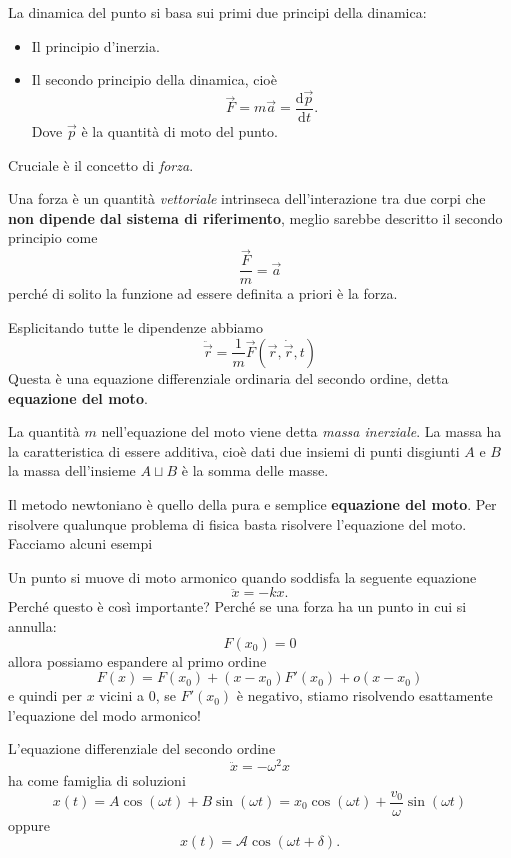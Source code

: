 \documentclass[11pt]{scrartcl}
\newcommand{\dif}{\text{d}}
\begin{document}
	La dinamica del punto si basa sui primi due principi della dinamica:
	\begin{itemize}
		\item Il principio d'inerzia.
		\item Il secondo principio della dinamica, cioè
		$$\vec{F}=m\vec{a}=\frac{\dif \vec{p}}{\dif t}.$$
		Dove $\vec{p}$ è la quantità di moto del punto.
	\end{itemize}
	Cruciale è il concetto di \textit{forza}. 
	\begin{definition}[Forza]
		Una forza è un quantità \textit{vettoriale} intrinseca dell'interazione tra due corpi che \textbf{non dipende dal sistema di riferimento}, meglio sarebbe descritto il secondo principio come
		$$\frac{\vec{F}}{m}=\vec{a}$$
		perché di solito la funzione ad essere definita a priori è la forza.
	\end{definition}
	Esplicitando tutte le dipendenze abbiamo
	$$\ddot{\vec{r}}=\frac{1}{m}\vec{F}(\vec{r},\dot{\vec{r}},t)$$
	Questa è una equazione differenziale ordinaria del secondo ordine, detta \textbf{equazione del moto}.
	\begin{definition}
		La quantità $m$ nell'equazione del moto viene detta \textit{massa inerziale}. La massa ha la caratteristica di essere additiva, cioè dati due insiemi di punti disgiunti $A$ e $B$ la massa dell'insieme $A\sqcup B$ è la somma delle masse.
	\end{definition}
	Il metodo newtoniano è quello della pura e semplice \textbf{equazione del moto}. Per risolvere qualunque problema di fisica basta risolvere l'equazione del moto. Facciamo alcuni esempi
	\begin{example}
		Un punto si muove di moto armonico quando soddisfa la seguente equazione
		$$\ddot{x}=-kx.$$
		Perché questo è così importante? Perché se una forza ha un punto in cui si annulla:
		$$F(x_0)=0$$
		allora possiamo espandere al primo ordine
		$$F(x)=F(x_0)+(x-x_0)F'(x_0)+o(x-x_0)$$
		e quindi per $x$ vicini a $0$, se $F'(x_0)$ è negativo, stiamo risolvendo esattamente l'equazione del modo armonico!
	\end{example}
	\begin{lemma}
		L'equazione differenziale del secondo ordine 
		$$\ddot{x}=-\omega^2 x$$
		ha come famiglia di soluzioni
		$$x(t)=A\cos(\omega t)+ B \sin(\omega t)=x_0\cos(\omega t)+\frac{v_0}{\omega}\sin(\omega t)$$
		oppure
		$$x(t)=\mathcal{A}\cos(\omega t + \delta).$$
	\end{lemma}
\end{document}

